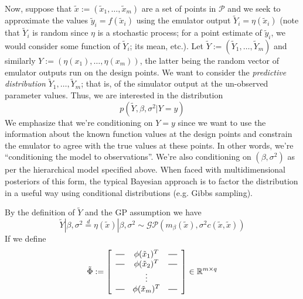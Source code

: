 \documentclass[12pt]{article}
\newcommand{\R}{\mathcal{R}}
\def\R{\mathbb{R}}
\newcommand*{\horzbar}{\rule[.5ex]{2.5ex}{0.5pt}} %
\begin{document}
Now, suppose that $\tilde{x} := (\tilde{x}_1, \dots, \tilde{x}_m)$ are a set of points in $\mathcal{P}$ and we seek to approximate the values $\tilde{y}_i = f(\tilde{x}_i)$ using the 
emulator output $\tilde{Y}_i = \eta(\tilde{x}_i)$ (note that $\tilde{Y}_i$ is random since $\eta$ is a stochastic process; for a point estimate of $\tilde{y}_i$, we would consider some function of $\tilde{Y}_i$; 
its mean, etc.). Let $\tilde{Y} := (\tilde{Y}_1, \dots, \tilde{Y}_m)$ and similarly $Y := (\eta(x_1), \dots, \eta(x_m))$, the latter being the random vector of emulator outputs run on the design points. We want 
to consider the \textit{predictive distribution} $\tilde{Y}_1, \dots, \tilde{Y}_m$; that is, of the simulator output at the un-observed parameter values. Thus, we are interested 
in the distribution 
\[p(\tilde{Y}, \beta, \sigma^2|Y = y)\]
We emphasize that we're conditioning on $Y = y$ since we want to use the information about the known function values at the design points and constrain the emulator to agree with the true values 
at these points. In other words, we're ``conditioning the model to observations''. We're also conditioning on $(\beta, \sigma^2)$ as per the hierarchical model specified above. 
When faced with multidimensional posteriors of this form, the typical Bayesian approach is to factor the distribution in a 
useful way using conditional distributions (e.g. Gibbs sampling). 

By the definition of $\tilde{Y}$ and the GP assumption we have 
\[\tilde{Y}|\beta, \sigma^2 \overset{d}{=} \eta(\tilde{x})|\beta, \sigma^2 \sim \mathcal{GP}(m_\beta (\tilde{x}), \sigma^2 c(\tilde{x}, \tilde{x}))\]
If we define 
\[
\tilde{\Phi} := 
\left[
  \begin{array}{ccc}
    \horzbar & \phi(\tilde{x}_1)^T & \horzbar \\
    \horzbar & \phi(\tilde{x}_2)^T & \horzbar \\
             & \vdots    &          \\
    \horzbar & \phi(\tilde{x}_m)^T & \horzbar
  \end{array}
\right] \in \R^{m \times q}
\]
\end{document}
